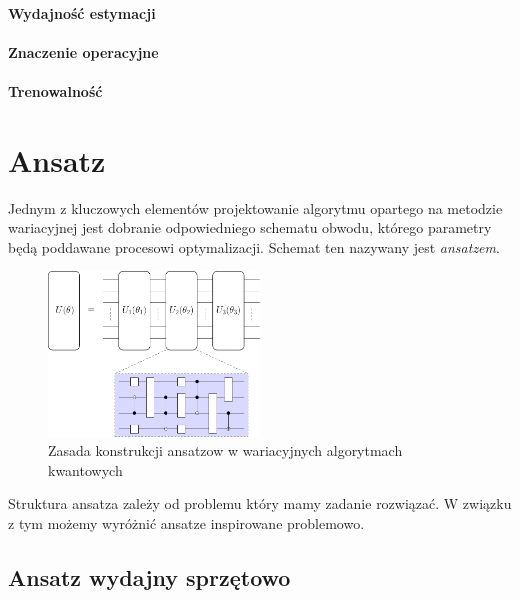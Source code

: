 \documentclass[a4paper,11pt]{article}
\begin{document}
\paragraph{Wydajność estymacji}
\paragraph{Znaczenie operacyjne}
\paragraph{Trenowalność}

\newpage 

\hypertarget{typy-ansatzow}{%
	\section{Ansatz}\label{typy-ansatzow}}

Jednym z kluczowych elementów projektowanie algorytmu opartego na metodzie wariacyjnej jest dobranie odpowiedniego schematu obwodu, którego parametry będą poddawane procesowi optymalizacji. Schemat ten nazywany jest \emph{ansatzem}.


\begin{figure}[ht!]
	\centering
	\includegraphics[width=0.5\textwidth]{ansatz.pdf}
	\caption{Zasada konstrukcji ansatzow w wariacyjnych algorytmach kwantowych}
\end{figure}


Struktura ansatza zależy od problemu który mamy zadanie rozwiązać. W związku z tym możemy wyróżnić ansatze inspirowane problemowo.



\subsection{Ansatz wydajny sprzętowo}
\end{document}
